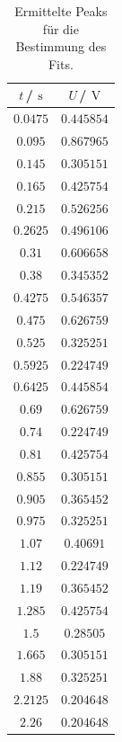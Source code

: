 \begin{table}
  \centering
  \caption{Ermittelte Peaks für die Bestimmung des Fits.}
  \label{tab:Peaks_T2}
  \begin{tabular}{c c}
    \toprule
    $t$\,/\,$\SI{}{\second}$&$U$\,/\,$\SI{}{\volt}$\\
    \midrule
    $\num{0.0475}$&$\num{0.445854}$\\
    $\num{0.095}$&$\num{0.867965}$\\
    $\num{0.145}$&$\num{0.305151}$\\
    $\num{0.165}$&$\num{0.425754}$\\
    $\num{0.215}$&$\num{0.526256}$\\
    $\num{0.2625}$&$\num{0.496106}$\\
    $\num{0.31}$&$\num{0.606658}$\\
    $\num{0.38}$&$\num{0.345352}$\\
    $\num{0.4275}$&$\num{0.546357}$\\
    $\num{0.475}$&$\num{0.626759}$\\
    $\num{0.525}$&$\num{0.325251}$\\
    $\num{0.5925}$&$\num{0.224749}$\\
    $\num{0.6425}$&$\num{0.445854}$\\
    $\num{0.69}$&$\num{0.626759}$\\
    $\num{0.74}$&$\num{0.224749}$\\
    $\num{0.81}$&$\num{0.425754}$\\
    $\num{0.855}$&$\num{0.305151}$\\
    $\num{0.905}$&$\num{0.365452}$\\
    $\num{0.975}$&$\num{0.325251}$\\
    $\num{1.07}$&$\num{0.40691}$\\
    $\num{1.12}$&$\num{0.224749}$\\
    $\num{1.19}$&$\num{0.365452}$\\
    $\num{1.285}$&$\num{0.425754}$\\
    $\num{1.5}$&$\num{0.28505}$\\
    $\num{1.665}$&$\num{0.305151}$\\
    $\num{1.88}$&$\num{0.325251}$\\
    $\num{2.2125}$&$\num{0.204648}$\\
    $\num{2.26}$&$\num{0.204648}$\\
    \bottomrule
  \end{tabular}
\end{table}   
